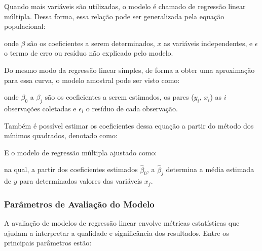 Quando mais variáveis são utilizadas, o modelo é chamado de regressão linear múltipla. Dessa forma, essa relação pode ser generalizada pela equação populacional:

onde $\beta$ são os coeficientes a serem determinados, $x$ as variáveis independentes, e $\epsilon$ o termo de erro ou resíduo não explicado pelo modelo.

Do mesmo modo da regressão linear simples, de forma a obter uma aproximação para essa curva, o modelo amostral pode ser visto como:


onde $\beta_0$ a $\beta_j$ são os coeficientes a serem estimados, os pares ($y_i$, $x_i$) as $i$ observações coletadas e $\epsilon_i$ o resíduo de cada observação.

Também é possível estimar os coeficientes dessa equação a partir do método dos mínimos quadrados, denotado como:


E o modelo de regressão múltipla ajustado como:

 na qual, a partir dos coeficientes estimados $\hat{\beta}_0$, a $\hat{\beta}_j$ determina a média estimada de $y$ para determinados valores das variáveis $x_j$.

\subsubsection{Parâmetros de Avaliação do Modelo}
A avaliação de modelos de regressão linear envolve métricas estatísticas que ajudam a interpretar a qualidade e significância dos resultados. Entre os principais parâmetros estão:

